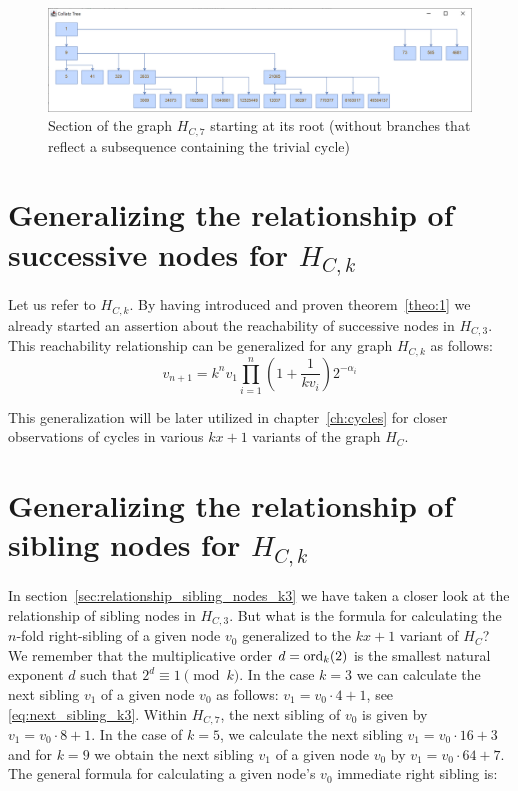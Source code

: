 \begin{figure}[H]
	\includegraphics[width=1.00\textwidth]{figures/h_c7.png}
	\caption{Section of the graph $H_{C,7}$ starting at its root (without branches that reflect a subsequence containing the trivial cycle)}
	\label{fig:hc7}
\end{figure}

\section{\texorpdfstring{Generalizing the relationship of successive nodes for $H_{C,k}$}{Generalizing the relationship of successive nodes for HCk}}
Let us refer to $H_{C,k}$. By having introduced and proven theorem~\ref{theo:1} we already started an assertion about the reachability of successive nodes in $H_{C,3}$. This reachability relationship can be generalized for any graph $H_{C,k}$ as follows:
\begin{equation}
	\label{eq:generalized_reachability}
	v_{n+1}=k^nv_1\prod_{i=1}^{n}\left(1+\frac{1}{kv_{i}}\right)2^{-\alpha_i}
\end{equation}

This generalization will be later utilized in chapter~\ref{ch:cycles} for closer observations of cycles in various $kx+1$ variants of the graph $H_C$.

\section{\texorpdfstring{Generalizing the relationship of sibling nodes for $H_{C,k}$}{Generalizing the relationship of sibling nodes for HCk}}
In section~\ref{sec:relationship_sibling_nodes_k3} we have taken a closer look at the relationship of sibling nodes in $H_{C,3}$. But what is the formula for calculating the $n$-fold right-sibling of a given node $v_0$ generalized to the $kx+1$ variant of $H_C$? We remember that the multiplicative order $d=\operatorname{ord}_k(2)$ is the smallest natural exponent $d$ such that $2^d\equiv 1\pmod k$. In the case $k=3$ we can calculate the next sibling $v_1$ of a given node $v_0$ as follows: $v_1=v_0\cdot4+1$, see \ref{eq:next_sibling_k3}. Within $H_{C,7}$, the next sibling of $v_0$ is given by $v_1=v_0\cdot8+1$. In the case of $k=5$, we calculate the next sibling $v_1=v_0\cdot16+3$ and for $k=9$ we obtain the next sibling $v_1$ of a given node $v_0$ by $v_1=v_0\cdot64+7$. The general formula for calculating a given node's $v_0$ immediate right sibling is:


